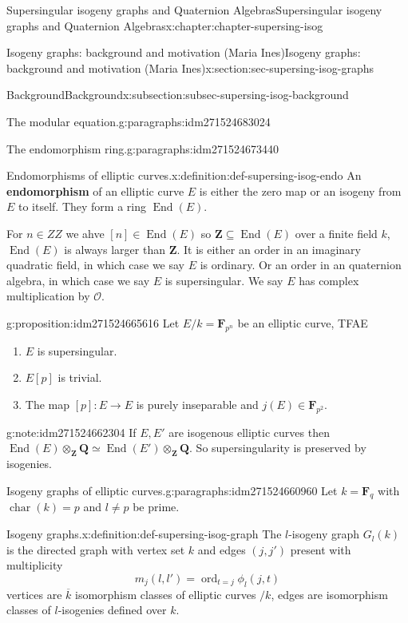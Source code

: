 \documentclass[oneside,10pt,]{book}
\newcommand{\terminology}[1]{\textbf{#1}}
\numberwithin{equation}{section}
\newcommand{\lb}{[}
\newcommand{\rb}{]}
\newcommand{\ZZ}{\mathbf{Z}}
\newcommand{\QQ}{\mathbf{Q}}
\newcommand{\FF}{\mathbf{F}}
\newcommand{\ints}{\mathcal{O}}
\DeclareMathOperator{\End}{End}
\DeclareMathOperator{\characteristic}{char}
\DeclareMathOperator{\ord}{ord}
\begin{document}
\begin{chapterptx}{Supersingular isogeny graphs and Quaternion Algebras}{}{Supersingular isogeny graphs and Quaternion Algebras}{}{}{x:chapter:chapter-supersing-isog}
\begin{sectionptx}{Isogeny graphs: background and motivation (Maria Ines)}{}{Isogeny graphs: background and motivation (Maria Ines)}{}{}{x:section:sec-supersing-isog-graphs}
\begin{subsectionptx}{Background}{}{Background}{}{}{x:subsection:subsec-supersing-isog-background}
\begin{paragraphs}{The modular equation.}{g:paragraphs:idm271524683024}
\end{paragraphs}%
\begin{paragraphs}{The endomorphism ring.}{g:paragraphs:idm271524673440}%
\begin{definition}{Endomorphisms of elliptic curves.}{x:definition:def-supersing-isog-endo}%
An \terminology{endomorphism} of an elliptic curve \(E\) is either the zero map or an isogeny from \(E\) to itself. They form a ring \(\End(E)\).%
\end{definition}
For \(n \in ZZ\) we ahve \(\lb n \rb \in \End(E)\) so \(\ZZ \subseteq \End(E)\) over a finite field \(k\), \(\End(E)\) is always larger than \(\ZZ\). It is either an order in an imaginary quadratic field, in which case we say \(E\) is ordinary. Or an order in an quaternion algebra, in which case we say \(E\) is supersingular. We say \(E\) has complex multiplication by \(\ints\).%
\begin{proposition}{}{}{g:proposition:idm271524665616}%
Let \(E/k = \FF_{p^n}\) be an elliptic curve, TFAE%
\begin{enumerate}
\item{}\(E\) is supersingular.%
\item{}\(E\lb p\rb\) is trivial.%
\item{}The map \(\lb p\rb \colon E\to E\) is purely inseparable and \(j(E) \in \FF_{p^2}\).%
\end{enumerate}
%
\end{proposition}
\begin{note}{}{g:note:idm271524662304}%
If \(E,E'\) are isogenous elliptic curves then \(\End(E) \otimes_\ZZ \QQ \simeq \End(E')\otimes_\ZZ \QQ\). So supersingularity is preserved by isogenies.%
\end{note}
\end{paragraphs}%
\begin{paragraphs}{Isogeny graphs of elliptic curves.}{g:paragraphs:idm271524660960}%
Let \(k = \FF_q\) with \(\characteristic(k) = p\) and \(l \ne p \) be prime.%
\begin{definition}{Isogeny graphs.}{x:definition:def-supersing-isog-graph}%
The \(l\)-isogeny graph \(G_l(k)\) is the directed graph with vertex set \(k\) and edges \((j,j')\) present with multiplicity%
\begin{equation*}
m_j(l,l') = \ord_{t=j} \phi_l(j,t)
\end{equation*}
vertices are \(\overline k\) isomorphism classes of  elliptic curves \(/k\), edges are isomorphism classes of \(l\)-isogenies defined over \(k\).%
\end{definition}

\end{paragraphs}
\end{subsectionptx}
\end{sectionptx}
\end{chapterptx}
\end{document}

